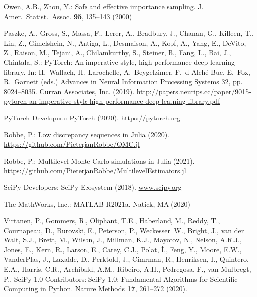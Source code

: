 \documentclass[graybox]{svmult}
\begin{document}
\begin{thebibliography}{10}
Owen, A.B., Zhou, Y.: Safe and effective importance sampling.
\newblock J. Amer.\ Statist.\ Assoc. \textbf{95}, 135--143 (2000)

Paszke, A., Gross, S., Massa, F., Lerer, A., Bradbury, J., Chanan, G., Killeen,
  T., Lin, Z., Gimelshein, N., Antiga, L., Desmaison, A., Kopf, A., Yang, E.,
  DeVito, Z., Raison, M., Tejani, A., Chilamkurthy, S., Steiner, B., Fang, L.,
  Bai, J., Chintala, S.: {PyTorch}: An imperative style, high-performance deep
  learning library.
\newblock In: H.~Wallach, H.~Larochelle, A.~Beygelzimer, F.~d\textquotesingle
  Alch\'{e}-Buc, E.~Fox, R.~Garnett (eds.) Advances in Neural Information
  Processing Systems 32, pp. 8024--8035. Curran Associates, Inc. (2019).
\newblock
  \urlprefix\url{http://papers.neurips.cc/paper/9015-pytorch-an-imperative-style-high-performance-deep-learning-library.pdf}

{PyTorch Developers}: {PyTorch} (2020).
\newblock \urlprefix\url{https://pytorch.org}

Robbe, P.: Low discrepancy sequences in {J}ulia (2020).
\newblock \urlprefix\url{https://github.com/PieterjanRobbe/QMC.jl}

Robbe, P.: Multilevel {M}onte {C}arlo simulations in {J}ulia (2021).
\newblock
  \urlprefix\url{https://github.com/PieterjanRobbe/MultilevelEstimators.jl}

{SciPy Developers}: {SciPy Ecosystem} (2018).
\newblock \urlprefix\url{www.scipy.org}

{The MathWorks, Inc.}: {MATLAB} R2021a.
\newblock Natick, MA (2020)

Virtanen, P., Gommers, R., Oliphant, T.E., Haberland, M., Reddy, T.,
  Cournapeau, D., Burovski, E., Peterson, P., Weckesser, W., Bright, J., {van
  der Walt}, S.J., Brett, M., Wilson, J., Millman, K.J., Mayorov, N., Nelson,
  A.R.J., Jones, E., Kern, R., Larson, E., Carey, C.J., Polat, {\.I}., Feng,
  Y., Moore, E.W., {VanderPlas}, J., Laxalde, D., Perktold, J., Cimrman, R.,
  Henriksen, I., Quintero, E.A., Harris, C.R., Archibald, A.M., Ribeiro, A.H.,
  Pedregosa, F., {van Mulbregt}, P., {SciPy 1.0 Contributors}: {{SciPy} 1.0:
  Fundamental Algorithms for Scientific Computing in Python}.
\newblock Nature Methods \textbf{17}, 261--272 (2020).
\newblock {}

\end{thebibliography}
\end{document}
